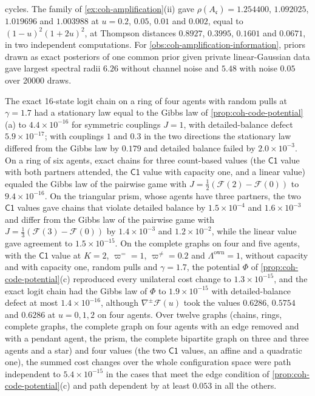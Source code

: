 \begin{numcheck}
cycles. The family of \cref{ex:coh-amplification}(ii) gave $\rho(A_{\mathfrak c})=1.254400$, $1.092025$, $1.019696$ and $1.003988$ at $u=0.2$, $0.05$, $0.01$ and $0.002$, equal to $(1-u)^2(1+2u)^2$, at Thompson distances $0.8927$, $0.3995$, $0.1601$ and $0.0671$, in two independent computations. For \cref{obs:coh-amplification-information}, priors drawn as exact posteriors of one common prior given private linear-Gaussian data gave largest spectral radii $6.26$ without channel noise and $5.48$ with noise $0.05$ over 20000 draws.
\end{numcheck}

\begin{numcheck}\label{chk:coh-codes}
The exact 16-state logit chain on a ring of four agents with random pulls at $\gamma=1.7$ had a stationary law equal to the Gibbs law of \cref{prop:coh-code-potential}(a) to $4.4\times10^{-16}$ for symmetric couplings $J=1$, with detailed-balance defect $5.9\times10^{-17}$; with couplings $1$ and $0.3$ in the two directions the stationary law differed from the Gibbs law by $0.179$ and detailed balance failed by $2.0\times10^{-3}$. On a ring of six agents, exact chains for three count-based values (the $\mathsf{C1}$ value with both partners attended, the $\mathsf{C1}$ value with capacity one, and a linear value) equaled the Gibbs law of the pairwise game with $J=\frac12(\mathcal F(2)-\mathcal F(0))$ to $9.4\times10^{-16}$. On the triangular prism, whose agents have three partners, the two $\mathsf{C1}$ values gave chains that violate detailed balance by $1.5\times10^{-4}$ and $1.6\times10^{-3}$ and differ from the Gibbs law of the pairwise game with $J=\frac13(\mathcal F(3)-\mathcal F(0))$ by $1.4\times10^{-3}$ and $1.2\times10^{-2}$, while the linear value gave agreement to $1.5\times10^{-15}$. On the complete graphs on four and five agents, with the $\mathsf{C1}$ value at $K=2$, $\varpi^{=}=1$, $\varpi^{\neq}=0.2$ and $\Lambda^{\mathrm{own}}=1$, without capacity and with capacity one, random pulls and $\gamma=1.7$, the potential $\Phi$ of \cref{prop:coh-code-potential}(c) reproduced every unilateral cost change to $1.3\times10^{-15}$, and the exact logit chain had the Gibbs law of $\Phi$ to $1.9\times10^{-15}$ with detailed-balance defect at most $1.4\times10^{-16}$, although $\nabla^{\pm}\mathcal F(u)$ took the values $0.6286$, $0.5754$ and $0.6286$ at $u=0,1,2$ on four agents. Over twelve graphs (chains, rings, complete graphs, the complete graph on four agents with an edge removed and with a pendant agent, the prism, the complete bipartite graph on three and three agents and a star) and four values (the two $\mathsf{C1}$ values, an affine and a quadratic one), the summed cost changes over the whole configuration space were path independent to $5.4\times10^{-15}$ in the cases that meet the edge condition of \cref{prop:coh-code-potential}(c) and path dependent by at least $0.053$ in all the others.
\end{numcheck}


